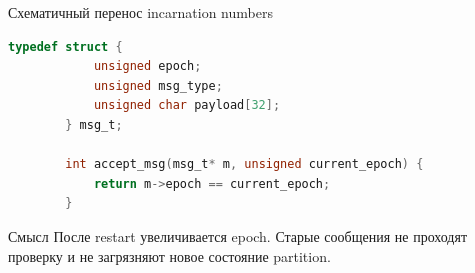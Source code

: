\begin{frame}[fragile]{Схематичный перенос incarnation numbers}
	\begin{lstlisting}[language=C]
		typedef struct {
			unsigned epoch;
			unsigned msg_type;
			unsigned char payload[32];
		} msg_t;
		
		int accept_msg(msg_t* m, unsigned current_epoch) {
			return m->epoch == current_epoch;
		}
	\end{lstlisting}
	
	\vspace{0.2cm}
	
	\begin{block}{Смысл}
		После restart увеличивается epoch.
		Старые сообщения не проходят проверку и не загрязняют новое состояние partition.
	\end{block}
\end{frame}